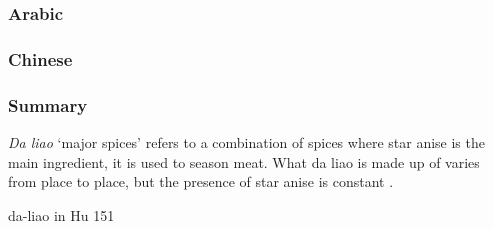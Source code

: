 \subsubsection{Arabic}



\subsubsection{Chinese}



\subsubsection{Summary}










\textit{Da liao} `major spices' refers to a combination of spices where star anise is the main ingredient, it is used to season meat. What da liao is made up of varies from place to place, but the presence of star anise is constant \parencite[152]{}.  

da-liao in Hu 151












